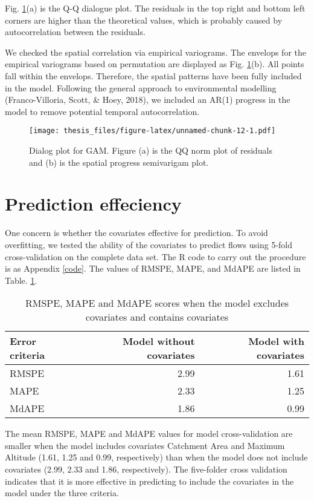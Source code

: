 \documentclass[12pt,oneside]{reedthesis}
\begin{document}
Fig. \ref{fig:check}(a) is the Q-Q dialogue plot. The residuals in the top right and bottom left corners are higher than the theoretical values, which is probably caused by autocorrelation between the residuals.

We checked the spatial correlation via empirical variograms. The envelops for the empirical variograms based on permutation are displayed as Fig. \ref{fig:check}(b). All points fall within the envelops. Therefore, the spatial patterns have been fully included in the model. Following the general approach to environmental modelling (Franco-Villoria, Scott, \& Hoey, 2018), we included an AR(1) progress in the model to remove potential temporal autocorrelation.
\begin{figure}
\centering
\texttt{[image: thesis\_files/figure-latex/unnamed-chunk-12-1.pdf]}
\caption{\label{fig:unnamed-chunk-12}\label{fig:check} Dialog plot for GAM. Figure (a) is the QQ norm plot of residuals and (b) is the spatial progress semivarigam plot.}
\end{figure}
\hypertarget{prediction-effeciency}{%
\section{Prediction effeciency}\label{prediction-effeciency}}

One concern is whether the covariates effective for prediction. To avoid overfitting, we tested the ability of the covariates to predict flows using 5-fold cross-validation on the complete data set. The R code to carry out the procedure is as Appendix \ref{code}. The values of RMSPE, MAPE, and MdAPE are listed in Table. \ref{tab:MSE}.
\begin{table}[!h]

\caption{\label{tab:unnamed-chunk-13}\label{tab:MSE} RMSPE, MAPE and MdAPE scores when the model excludes covariates and contains covariates}
\centering
\fontsize{10}{12}\selectfont
\begin{tabular}[t]{lrr}
\toprule
Error criteria & Model without covariates & Model with covariates\\
\midrule
RMSPE & 2.99 & 1.61\\
MAPE & 2.33 & 1.25\\
MdAPE & 1.86 & 0.99\\
\bottomrule
\end{tabular}
\end{table}
The mean RMSPE, MAPE and MdAPE values for model cross-validation are smaller when the model includes covariates Catchment Area and Maximum Altitude (1.61, 1.25 and 0.99, respectively) than when the model does not include covariates (2.99, 2.33 and 1.86, respectively). The five-folder cross validation indicates that it is more effective in predicting to include the covariates in the model under the three criteria.
\end{document}
